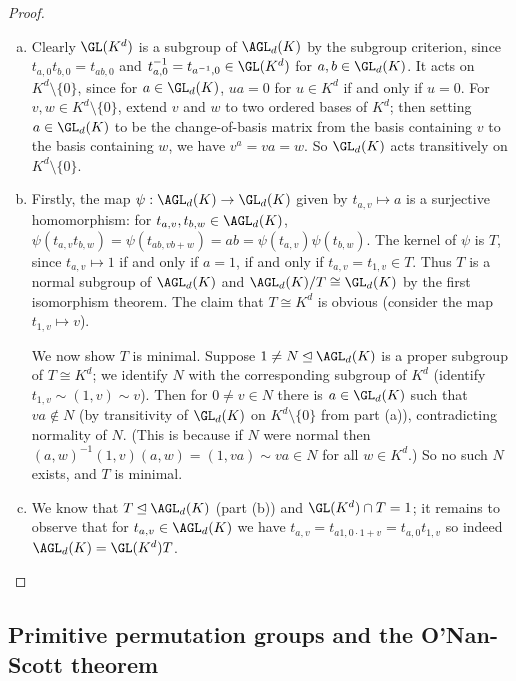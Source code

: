 \begin{proof}
    \begin{enumerate}[(a)]
        \item Clearly $\GL(K^d)$ is a subgroup of $\AGL_d(K)$ by the subgroup criterion, since $t_{a,0}t_{b,0} = t_{ab,0}$ and $t_{a,0}^{-1} = t_{a^{-1},0} \in \GL(K^d)$ for $a,b \in \GL_d(K)$. It acts on $K^d \setminus \{0\}$, since for $a \in \GL_d(K)$, $ua = 0$ for $u \in K^d$ if and only if $u = 0$. For $v,w \in K^d \setminus \{0\}$, extend $v$ and $w$ to two ordered bases of $K^d$; then setting $a \in \GL_d(K)$ to be the change-of-basis matrix from the basis containing $v$ to the basis containing $w$, we have $v^a = va = w$. So $\GL_d(K)$ acts transitively on $K^d \setminus \{0\}$.
        \item Firstly, the map $\psi : \AGL_d(K) \to \GL_d(K)$ given by $t_{a,v} \mapsto a$ is a surjective homomorphism: for $t_{a,v},t_{b,w} \in \AGL_d(K)$, $\psi(t_{a,v}t_{b,w}) = \psi(t_{ab,vb+w}) = ab = \psi(t_{a,v})\psi(t_{b,w})$. The kernel of $\psi$ is $T$, since $t_{a,v} \mapsto 1$ if and only if $a = 1$, if and only if $t_{a,v} = t_{1,v} \in T$. Thus $T$ is a normal subgroup of $\AGL_d(K)$ and $\AGL_d(K)/T \cong \GL_d(K)$ by the first isomorphism theorem. The claim that $T \cong K^d$ is obvious (consider the map $t_{1,v} \mapsto v$).

              We now show $T$ is minimal. Suppose $1 \neq N \unlhd \AGL_d(K)$ is a proper subgroup of $T \cong K^d$; we identify $N$ with the corresponding subgroup of $K^d$ (identify $t_{1,v} \sim (1,v) \sim v$). Then for $0 \neq v \in N$ there is $a \in \GL_d(K)$ such that $va \not\in N$ (by transitivity of $\GL_d(K)$ on $K^d \setminus \{0\}$ from part (a)), contradicting normality of $N$. (This is because if $N$ were normal then $(a,w)^{-1}(1,v)(a,w) = (1,va) \sim va \in N$ for all $w \in K^d$.) So no such $N$ exists, and $T$ is minimal.
        \item We know that $T \unlhd \AGL_d(K)$ (part (b)) and $\GL(K^d) \cap T = 1$; it remains to observe that for $t_{a,v} \in \AGL_d(K)$ we have $t_{a,v} = t_{a1,0 \cdot 1+v} = t_{a,0}t_{1,v}$ so indeed $\AGL_d(K) = \GL(K^d)T$.
    \end{enumerate}
\end{proof}


\subsection{Primitive permutation groups and the O'Nan-Scott theorem}

